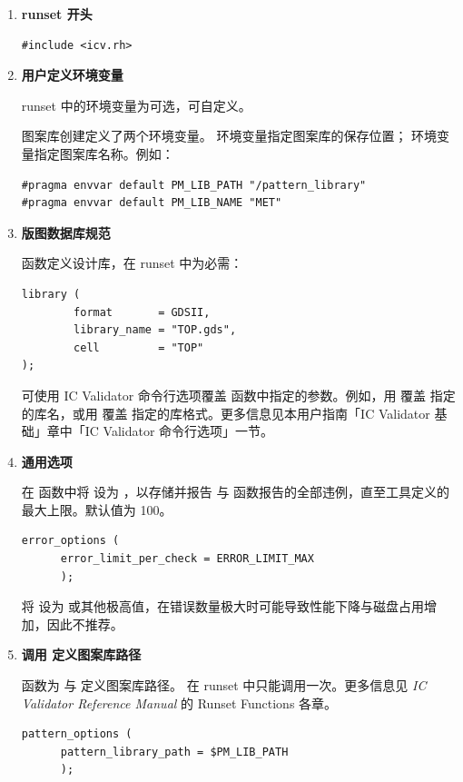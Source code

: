 \begin{enumerate}
  \item \textbf{runset 开头}
\begin{lstlisting}[style=pxl]
#include <icv.rh>
\end{lstlisting}

  \item \textbf{用户定义环境变量}

  runset 中的环境变量为可选，可自定义。

  图案库创建定义了两个环境变量。 环境变量指定图案库的保存位置； 环境变量指定图案库名称。例如：
\begin{lstlisting}[style=pxl]
#pragma envvar default PM_LIB_PATH "/pattern_library"
#pragma envvar default PM_LIB_NAME "MET"
\end{lstlisting}

  \item \textbf{版图数据库规范}

   函数定义设计库，在 runset 中为必需：
\begin{lstlisting}[style=pxl]
library (
        format       = GDSII,
        library_name = "TOP.gds",
        cell         = "TOP"
);
\end{lstlisting}

  可使用 IC Validator 命令行选项覆盖  函数中指定的参数。例如，用  覆盖  指定的库名，或用  覆盖  指定的库格式。更多信息见本用户指南「IC Validator 基础」章中「IC Validator 命令行选项」一节。

  \item \textbf{通用选项}

  在  函数中将  设为 ，以存储并报告  与  函数报告的全部违例，直至工具定义的最大上限。默认值为 100。
\begin{lstlisting}[style=pxl]
error_options (
      error_limit_per_check = ERROR_LIMIT_MAX
      );
\end{lstlisting}

  将  设为  或其他极高值，在错误数量极大时可能导致性能下降与磁盘占用增加，因此不推荐。

  \item \textbf{调用  定义图案库路径}

   函数为  与  定义图案库路径。 在 runset 中只能调用一次。更多信息见 \textit{IC Validator Reference Manual} 的 Runset Functions 各章。
\begin{lstlisting}[style=pxl]
pattern_options (
      pattern_library_path = $PM_LIB_PATH
      );
\end{lstlisting}


\end{enumerate}
